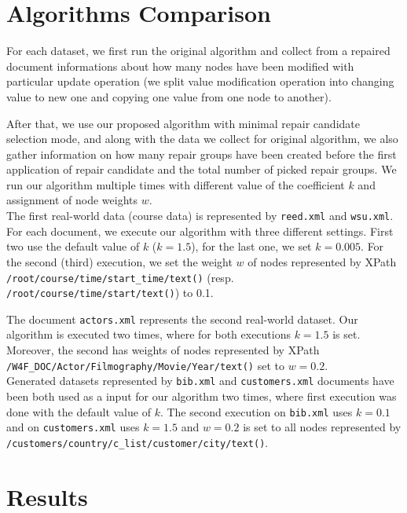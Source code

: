\section{Algorithms Comparison}

For each dataset, we first run the original algorithm and collect from a repaired document informations about how many nodes have been modified with particular update operation (we split value modification operation into changing value to new one and copying one value from one node to another).

After that, we use our proposed algorithm with minimal repair candidate selection mode, and along with the data we collect for original algorithm, we also gather information on how many repair groups have been created before the first application of repair candidate and the total number of picked repair groups. We run our algorithm multiple times with different value of the coefficient $k$ and assignment of node weights $w$.\\

The first real-world data (course data) is represented by \texttt{reed.xml} and \texttt{wsu.xml}. For each document, we execute our algorithm with three different settings. First two use the default value of $k$ ($k=1.5$), for the last one, we set $k=0.005$. For the second (third) execution, we set the weight $w$ of nodes represented by XPath \texttt{/root/course/time/start\_time/text()} (resp. \texttt{/root/course/time/\discretionary{}{}{}start/text()}) to 0.1.

The document \texttt{actors.xml} represents the second real-world dataset. Our algorithm is executed two times, where for both executions $k=1.5$ is set. Moreover, the second has weights of nodes represented by XPath \texttt{/W4F\_DOC/\discretionary{}{}{}Actor/Filmography/Movie/Year/text()} set to $w=0.2$.\\

Generated datasets represented by \texttt{bib.xml} and \texttt{customers.xml} documents have been both used as a input for our algorithm two times, where first execution was done with the default value of $k$. The second execution on \texttt{bib.xml} uses $k=0.1$ and on \texttt{customers.xml} uses $k=1.5$ and $w=0.2$ is set to all nodes represented by \texttt{/customers/country/c\_list/customer/city/text()}.

\section{Results}

